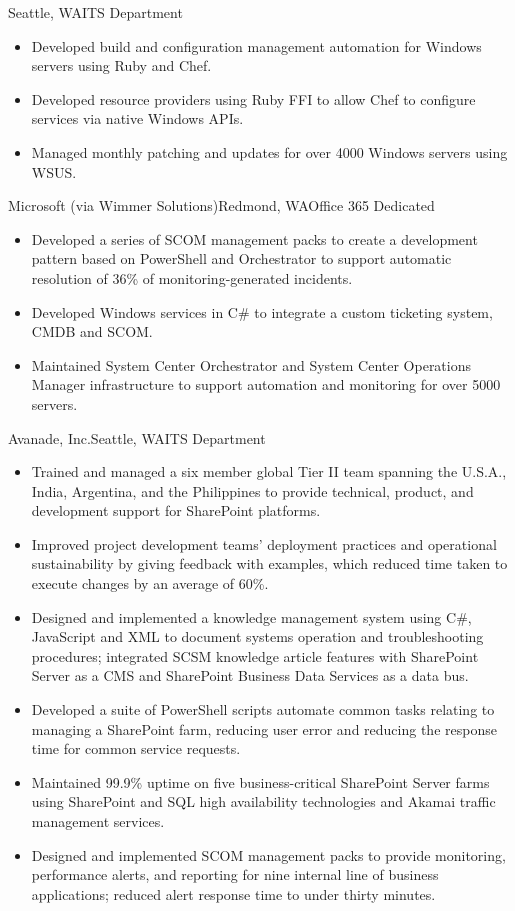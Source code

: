 \documentclass[11pt,letter,roman]{moderncv}
\begin{document}
{Seattle, WA}{ITS Department}{%
  \begin{itemize}
    \item Developed build and configuration management automation for Windows
      servers using Ruby and Chef.
    \item Developed resource providers using Ruby FFI to allow Chef to
      configure services via native Windows APIs.
    \item Managed monthly patching and updates for over 4000 Windows servers
      using WSUS.
  \end{itemize}
}
{Microsoft (via Wimmer Solutions)}{Redmond, WA}{Office 365 Dedicated}{%
  \begin{itemize}
    \item Developed a series of SCOM management packs to create a development
      pattern based on PowerShell and Orchestrator to support automatic
      resolution of 36\% of monitoring-generated incidents.
    \item Developed Windows services in C\# to integrate a custom ticketing
      system, CMDB and SCOM.
    \item Maintained System Center Orchestrator and System Center Operations
      Manager infrastructure to support automation and monitoring for over
      5000 servers.
  \end{itemize}
}
{Avanade, Inc.}{Seattle, WA}{ITS Department}{%
  \begin{itemize}
    \item Trained and managed a six member global Tier II team spanning the
      U.S.A., India, Argentina, and the Philippines to provide technical,
      product, and development support for SharePoint platforms.
    \item Improved project development teams' deployment practices and
      operational sustainability by giving feedback with examples, which
      reduced time taken to execute changes by an average of 60\%.
    \item Designed and implemented a knowledge management system using C\#,
      JavaScript and XML to document systems operation and troubleshooting
      procedures; integrated SCSM knowledge article features with SharePoint
      Server as a CMS and SharePoint Business Data Services as a data bus.
    \item Developed a suite of PowerShell scripts automate common tasks
      relating to managing a SharePoint farm, reducing user error and reducing
      the response time for common service requests.
    \item Maintained 99.9\% uptime on five business-critical SharePoint
      Server farms using SharePoint and SQL high availability technologies and
      Akamai traffic management services.
    \item Designed and implemented SCOM management packs to provide
      monitoring, performance alerts, and reporting for nine internal line of
      business applications; reduced alert response time to
      under thirty minutes.
  \end{itemize}
}
\end{document}
